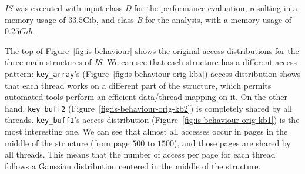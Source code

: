 \begin{figure*}[!htb]
    \centering


    \caption{Memory access distribution for the main structures of
        \emph{IS}. Original behavior on the top, modified on
    the bottom.}
    \label{fig:is-behaviour}

\end{figure*}



\emph{IS} was executed with input class \emph{D} for the performance
evaluation, resulting in a memory usage of $33.5$Gib, and class \emph{B} for
the analysis, with a memory usage of $0.25Gib$.

The top of Figure~\ref{fig:is-behaviour} shows the original access distributions for the
three main structures of \emph{IS}. We can see that
each structure has a different access pattern: \texttt{key\_array}'s
(Figure~\ref{fig:is-behaviour-orig-kba}) access distribution shows that each
thread works on a different part of the structure, which permits automated
tools perform an efficient data/thread mapping on it. On the other hand, \texttt{key\_buff2}
(Figure~\ref{fig:is-behaviour-orig-kb2}) is completely shared by all threads.
\texttt{key\_buff1}'s access distribution (Figure~\ref{fig:is-behaviour-orig-kb1})
is the most interesting one. We can see that almost all accesses occur
in pages in the middle of the structure (from page $500$ to $1500$), and those pages
are shared by all threads. This means that the number of access per page  for
each thread follows a Gaussian distribution centered in the middle of the
structure.

